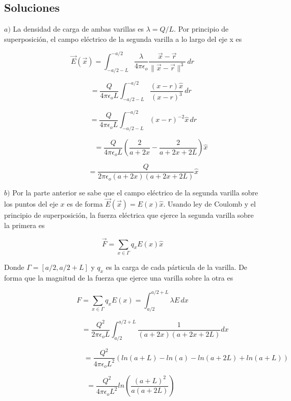 \subsection{Soluciones}
\medbreak
{}\newline

$a)$ La densidad de carga de ambas varillas es $\lambda = Q/L$. Por principio de superposición, el campo eléctrico de la segunda varilla a lo largo del eje x es

\[\Vec{E}(\Vec{x}) = \int^{-a/2}_{-a/2-L}\frac{\lambda}{4\pi\epsilon_o}\frac{\Vec{x}-\Vec{r}}{\parallel\Vec{x}-\Vec{r}\parallel^3}\,dr\]

\[\,\,\,\,\,\,\,\,\,\,\,\,\,\,= \frac{Q}{4\pi\epsilon_o L} \int^{-a/2}_{-a/2-L}\frac{(x-r)\hat{x}}{(x-r)^3}\,dr\]

\[\,\,\,\,\,\,\,\,\,\,\,\,\,\,\,\,\,\,= \frac{Q}{4\pi\epsilon_o L} \int^{-a/2}_{-a/2-L}(x-r)^{-2}\hat{x}\,dr\]

\[\,\,\,\,\,\,\,\,\,\,\,\,\,\,\,\,\,\,\,\,\,\,\,\,\,\,\,\,\,\,\,=\frac{Q}{4\pi\epsilon_o L}\left( \frac{2}{a+2x} - \frac{2}{a+2x+2L} \right)\hat{x}\]

\[\,\,\,\,\,\,\,\,\,\,\,\,\,\,\,\,\,\,=\frac{Q}{2\pi\epsilon_o(a+2x)(a+2x+2L)}\hat{x}\]

\bigbreak

$b)$ Por la parte anterior se sabe que el campo eléctrico de la segunda varilla sobre los puntos del eje $x$ es de forma $\Vec{E}(\Vec{x}) = E(x)\hat{x}$. Usando ley de Coulomb y el principio de superposición, la fuerza eléctrica que ejerce la segunda varilla sobre la primera es

\[\Vec{F}=\sum_{x\in\Gamma}q_xE(x)\hat{x}\]

Donde $\Gamma = [a/2, a/2+L]$ y $q_x$ es la carga de cada párticula de la varilla. De forma que la magnitud de la fuerza que ejerce una varilla sobre la otra es

\[F=\sum_{x\in\Gamma}q_xE(x)=\int^{a/2+L}_{a/2}\lambda E\,dx\]

\[\,\,\,\,\,\,\,\,\,\,\,\,\,\,\,\,\,\,\,\,\,\,\,\,\,\,\,\,\,\,\,\,\,\,\,\,\,\,=\frac{Q^2}{2\pi\epsilon_o L}\int^{a/2+L}_{a/2}\frac{1}{(a+2x)(a+2x+2L)}dx\]

\[\,\,\,\,\,\,\,\,\,\,\,\,\,\,\,\,\,\,\,\,\,\,\,\,\,\,\,\,\,\,\,\,\,\,\,\,\,\,\,\,\,\,\,\,\,\,\,\,\,\,\,\,\,\,\,\,\,\,\,\,\,\,\,\,\,\,\, = \frac{Q^2}{4\pi\epsilon_o L^2}\left( ln(a+L)-ln(a)-ln(a+2L)+ln(a+L) \right)\]

\[=\frac{Q^2}{4\pi\epsilon_o L^2}ln\left( \frac{(a+L)^2}{a(a+2L)} \right)\,\,\,\]

